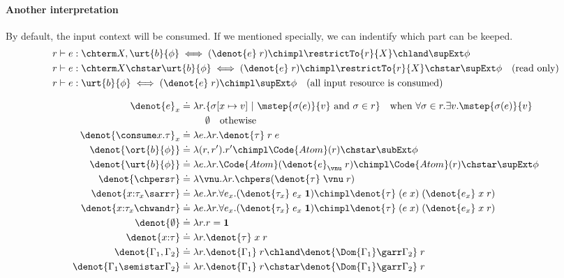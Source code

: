 \paragraph{Another interpretation} By default, the input context will be consumed. If we mentioned specially, we can indentify which part can be keeped.
\begin{align*}
&r \vdash e :  \chterm X,\urt{b}{\phi} \iff (\denot{e}\;r) \chimpl \restrictTo{r}{X} \chland \supExt\phi
\\&r \vdash e :  \chterm X \chstar \urt{b}{\phi} \iff (\denot{e}\;r) \chimpl \restrictTo{r}{X} \chstar \supExt\phi \quad \text{(read only)}
\\&r \vdash e :  \urt{b}{\phi} \iff (\denot{e}\;r) \chimpl \supExt\phi \quad \text{(all input resource is consumed)}
\end{align*}\noindent

\begin{align*}
  \denot{e}_x &\doteq \lambda r. \{\sigma[x\mapsto v] ~|~  \mstep{\sigma(e)}{v} \text{ and } \sigma \in r \} \quad \text{when } \forall \sigma \in r.\exists v. \mstep{\sigma(e)}{v}
  \\&\qquad\;\; \emptyset \quad \text{othewise }
  \\\denot{\consume x. \tau}_x &\doteq \lambda e.\lambda r. \denot{\tau}\;r\;e
  \\\denot{\ort{b}{\phi}} &\doteq \lambda (r,r'). r' \chimpl \Code{Atom}(r) \chstar \subExt\phi
  \\\denot{\urt{b}{\phi}} &\doteq \lambda e.\lambda r. \Code{Atom}(\denot{e}_\vnu\;r) \chimpl \Code{Atom}(r) \chstar \supExt\phi
  \\\denot{\chpers \tau} &\doteq \lambda \vnu.\lambda r. \chpers (\denot{\tau}\;\vnu\;r)
  \\\denot{x{:}\tau_x \sarr \tau} &\doteq \lambda e.\lambda r.\forall e_x. (\denot{\tau_x}\;e_x\;\textbf{1}) \chimpl \denot{\tau}\;(e\;x)\;(\denot{e_x}\;x\;r) 
  \\\denot{x{:}\tau_x \chwand \tau} &\doteq \lambda e.\lambda r.\forall e_x. (\denot{\tau_x}\;e_x\;\textbf{1}) \chimpl \denot{\tau}\;(e\;x)\;(\denot{e_x}\;x\;r) 
  \\\denot{\emptyset} &\doteq \lambda r.r = \mathbf{1}
  \\\denot{x{:}\tau} &\doteq \lambda r. \denot{\tau}\;x\;r
  \\\denot{\Gamma_1, \Gamma_2} &\doteq \lambda r.\denot{\Gamma_1}\;r \chland \denot{\Dom{\Gamma_1} \garr \Gamma_2}\;r 
  \\\denot{\Gamma_1 \semistar \Gamma_2} &\doteq \lambda r.\denot{\Gamma_1}\;r \chstar \denot{\Dom{\Gamma_1} \garr \Gamma_2}\;r 
\end{align*}\noindent

